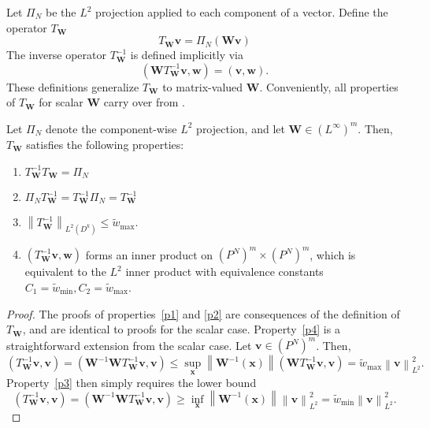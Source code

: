 \documentclass{siamart0216}
\newcommand{\nor}[1]{\left\| #1 \right\|}
\newcommand{\LRp}[1]{\left( #1 \right)}
\begin{document}
Let $\Pi_N$ be the $L^2$ projection applied to each component of a vector.  Define the operator $T_{\bm{W}}$
\[
T_{\bm{W}}\bm{v} = \Pi_N\LRp{\bm{W}\bm{v}} 
\]
The inverse operator $T^{-1}_{\bm{W}}$ is defined implicitly via
\[
\LRp{\bm{W}T^{-1}_{\bm{W}}\bm{v},\bm{w}} = \LRp{\bm{v},\bm{w}} .
\]
These definitions generalize $T_{\bm{W}}$ to matrix-valued $\bm{W}$.  Conveniently, all properties of $T_{\bm{W}}$ for scalar $\bm{W}$ carry over from \cite{chan2016weight1}.
\begin{lemma}
Let $\Pi_N$ denote the component-wise $L^2$ projection, and let $\bm{W} \in \LRp{L^{\infty}}^m$.  Then, $T_{\bm{W}}$ satisfies the following properties:
\begin{enumerate}
\vspace{.5em}
\item $T_{\bm{W}}^{-1}T_{\bm{W}} = \Pi_N$ \label{p1}
\vspace{.5em}
\item $\Pi_N T_{\bm{W}}^{-1} = T_{\bm{W}}^{-1}\Pi_N  =  T_{\bm{W}}^{-1}$ \label{p2}
\vspace{.5em}
\item $\nor{T^{-1}_{\bm{W}}}_{L^2\LRp{D^k}} \leq \tilde{w}_{\max}$. \label{p4}
\vspace{.5em}
\item $\LRp{T^{-1}_{\bm{W}} \bm{v},\bm{w}}$ forms an inner product on $\LRp{P^N}^m \times \LRp{P^N}^m$, which is equivalent to the $L^2$ inner product with equivalence constants $C_1 = \tilde{w}_{\min}, C_2 = \tilde{w}_{\max}$. \label{p3}
\vspace{.5em}
\end{enumerate}
\label{lemma:props}
\end{lemma}
\begin{proof}
The proofs of properties~\ref{p1} and \ref{p2} are consequences of the definition of $T_{\bm{W}}$, and are identical to proofs for the scalar case.  Property~\ref{p4} is a straightforward extension from the scalar case.  Let $\bm{v}\in \LRp{P^N}^m$.  Then, 
\[
\LRp{T^{-1}_{\bm{W}} \bm{v},\bm{v}} = \LRp{\bm{W}^{-1}\bm{W}T^{-1}_{\bm{W}} \bm{v},\bm{v}} \leq \sup_{\bm{x}}\nor{\bm{W}^{-1}(\bm{x})}\LRp{\bm{W}T^{-1}_{\bm{W}} \bm{v},\bm{v}} = \tilde{w}_{\max} \nor{\bm{v}}_{L^2}^2.
\]
Property~\ref{p3} then simply requires the lower bound
\[
\LRp{T^{-1}_{\bm{W}} \bm{v},\bm{v}} = \LRp{\bm{W}^{-1}\bm{W}T^{-1}_{\bm{W}} \bm{v},\bm{v}} \geq \inf_{\bm{x}}\nor{\bm{W}^{-1}(\bm{x})}\nor{\bm{v}}_{L^2}^2 = \tilde{w}_{\min}\nor{\bm{v}}_{L^2}^2 .  
\]
\end{proof}
\end{document}
